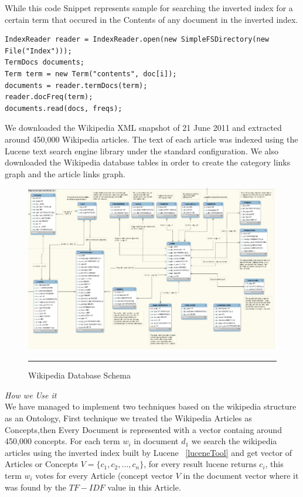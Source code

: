 While this code Snippet represents sample for searching the inverted index for a certain term that occured in the Contents of any document in the inverted index.\\

\begin{lstlisting}
IndexReader reader = IndexReader.open(new SimpleFSDirectory(new File("Index")));
TermDocs documents;
Term term = new Term("contents", doc[i]);
documents = reader.termDocs(term);
reader.docFreq(term);
documents.read(docs, freqs);
\end{lstlisting}

We downloaded the Wikipedia XML snapshot of 21 June 2011 and extracted around 450,000 Wikipedia articles. The text of each article was indexed using the Lucene text search engine library \citep{lucene} under the standard configuration. We also downloaded the Wikipedia database tables in order to create the category links graph and the article links graph.\\
\begin{figure}[htbp]
	\centering
		\includegraphics{./Figures/wiki_DB.png}
		\rule{35em}{0.05pt}
	\caption[Wikipedia Database Schema]{Wikipedia Database Schema}
	\label{fig:Wikipedia Database}
\end{figure}
\textit{How we Use it}\\
We have managed to implement two techniques based on the wikipedia structure as an Ontology, First technique we treated the Wikipedia Articles as Concepts\citep{wiki_1},then Every Document is represented with a vector containg around 450,000 concepts.
For each term $w_i$ in document $d_1$ we search the wikipedia articles using the inverted index built by Lucene ~\ref{luceneTool} and get vector of Articles or Concepts $V = \{c_1,c_2,...,c_n\}$, for every result lucene returns $c_i$, this term $w_i$ votes for every Article (concept  vector $V$ in the document vector where it was found by the $TF-IDF$ value in this Article.
